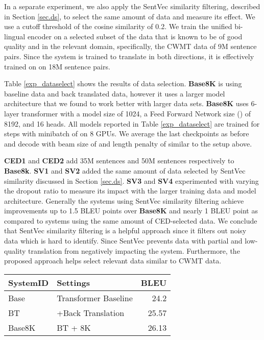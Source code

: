 \documentclass[a4paper]{article}
\begin{document}
\begin{CJK*}{UTF8}{gbsn}
In a separate experiment, we also apply the SentVec similarity filtering, described in Section \ref{sec.ds},  to select the same amount of data and measure its effect. We use  a cutoff threshold of the cosine similarity of 0.2. We train the unified bi-lingual encoder on a selected subset of the data that is known to be of good quality and in the relevant domain, specifically, the CWMT data of 9M sentence pairs. Since the system is trained to translate in both directions, it is effectively trained on on 18M sentence pairs.

Table \ref{exp_dataselect} shows the results of data selection. \textbf{Base8K} is using baseline data and back translated data, however it uses a larger model architecture that we found to work better with larger data sets. \textbf{Base8K} uses  6-layer transformer with a model size of 1024, a Feed Forward Network size () of 8192, and 16 heads. All models reported in Table \ref{exp_dataselect}  are trained for   steps with minibatch of  on 8 GPUs. We average the last  checkpoints as before and decode with beam size of  and length penalty of  similar to the setup above.

\textbf{CED1} and \textbf{CED2} add 35M sentences and 50M sentences respectively to \textbf{Base8k}. \textbf{SV1}
and \textbf{SV2} added the same amount of data selected by SentVec similarity discussed in Section \ref{sec.ds}.  \textbf{SV3} and  \textbf{SV4} experimented with varying the dropout ratio to measure its impact with the larger training data and model architecture. Generally the systems using  SentVec similarity filtering  achieve improvements up to 1.5  BLEU points over \textbf{Base8K} and nearly 1 BLEU point as compared to systems using the same amount of CED-selected data. We conclude that SentVec similarity filtering is a helpful approach since it filters out noisy data which is hard to identify. Since SentVec prevents data with partial and low-quality translation from negatively impacting the system. Furthermore, the proposed approach helps select relevant data similar to CWMT data.

\begin{table}[ht]
\centering
\begin{tabular}{@{}llr@{}}
\textbf{SystemID} &\textbf{Settings}                                       & \textbf{BLEU} \\
\toprule
Base & Transformer Baseline    & 24.2       \\ 
BT & +Back Translation     & 25.57                \\
Base8K & BT + 8K  & 26.13 \\
 

\end{tabular}
\end{table}
\end{CJK*}
\end{document}
